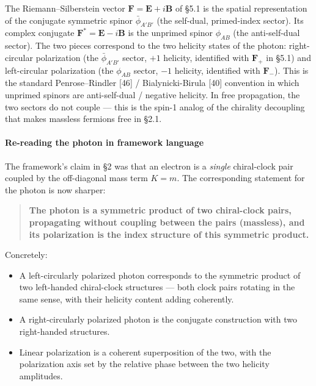 \documentclass[
]{article}
\providecommand{\tightlist}{%
  \setlength{\itemsep}{0pt}\setlength{\parskip}{0pt}}
\begin{document}
The Riemann--Silberstein vector
\(\mathbf{F} = \mathbf{E} + i\mathbf{B}\) of §5.1 is the spatial
representation of the conjugate symmetric spinor \(\bar\phi_{A'B'}\)
(the self-dual, primed-index sector). Its complex conjugate
\(\mathbf{F}^* = \mathbf{E} - i\mathbf{B}\) is the unprimed spinor
\(\phi_{AB}\) (the anti-self-dual sector). The two pieces correspond to
the two helicity states of the photon: right-circular polarization (the
\(\bar\phi_{A'B'}\) sector, \(+1\) helicity, identified with
\(\mathbf{F}_+\) in §5.1) and left-circular polarization (the
\(\phi_{AB}\) sector, \(-1\) helicity, identified with
\(\mathbf{F}_-\)). This is the standard Penrose--Rindler {[}46{]} /
Bialynicki-Birula {[}40{]} convention in which unprimed spinors are
anti-self-dual / negative helicity. In free propagation, the two sectors
do not couple --- this is the spin-1 analog of the chirality decoupling
that makes massless fermions free in §2.1.

\paragraph{Re-reading the photon in framework
language}\label{re-reading-the-photon-in-framework-language}

The framework's claim in §2 was that an electron is a \emph{single}
chiral-clock pair coupled by the off-diagonal mass term \(K = m\). The
corresponding statement for the photon is now sharper:

\begin{quote}
\textbf{The photon is a symmetric product of two chiral-clock pairs,
propagating without coupling between the pairs (massless), and its
polarization is the index structure of this symmetric product.}
\end{quote}

Concretely:

\begin{itemize}
\tightlist
\item
  A left-circularly polarized photon corresponds to the symmetric
  product of two left-handed chiral-clock structures --- both clock
  pairs rotating in the same sense, with their helicity content adding
  coherently.
\item
  A right-circularly polarized photon is the conjugate construction with
  two right-handed structures.
\item
  Linear polarization is a coherent superposition of the two, with the
  polarization axis set by the relative phase between the two helicity
  amplitudes.
\end{itemize}
\end{document}
